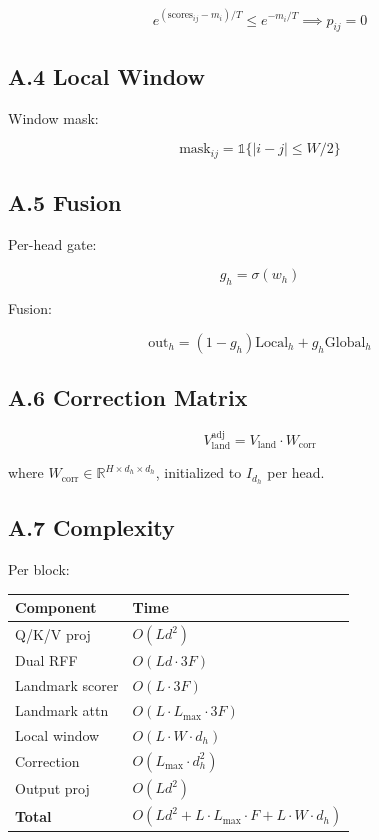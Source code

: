 \[
e^{(\text{scores}_{ij} - m_i)/T} \leq e^{-m_i/T} \implies p_{ij} = 0
\tag{A.9}
\]

\subsection{A.4 Local Window}

Window mask:

\[
\text{mask}_{ij} = \mathbb{1}\{|i - j| \leq W/2\}
\tag{A.10}
\]

\subsection{A.5 Fusion}

Per-head gate:

\[
g_h = \sigma(w_h)
\tag{A.11}
\]

Fusion:

\[
\text{out}_h = (1 - g_h) \text{Local}_h + g_h \text{Global}_h
\tag{A.12}
\]

\subsection{A.6 Correction Matrix}

\[
V_\text{land}^\text{adj} = V_\text{land} \cdot W_\text{corr}
\tag{A.13}
\]

where $W_\text{corr} \in \mathbb{R}^{H \times d_h \times d_h}$, initialized 
to $I_{d_h}$ per head.

\subsection{A.7 Complexity}

Per block:

\begin{table}[H]
\centering
\small
\begin{tabular}{ll}
\toprule
\textbf{Component} & \textbf{Time} \\
\midrule
Q/K/V proj & $O(L d^2)$ \\
Dual RFF & $O(L d \cdot 3F)$ \\
Landmark scorer & $O(L \cdot 3F)$ \\
Landmark attn & $O(L \cdot L_\text{max} \cdot 3F)$ \\
Local window & $O(L \cdot W \cdot d_h)$ \\
Correction & $O(L_\text{max} \cdot d_h^2)$ \\
Output proj & $O(L d^2)$ \\
\textbf{Total} & $O(L d^2 + L \cdot L_\text{max} \cdot F + L \cdot W \cdot d_h)$ \\
\bottomrule
\end{tabular}
\end{table}

